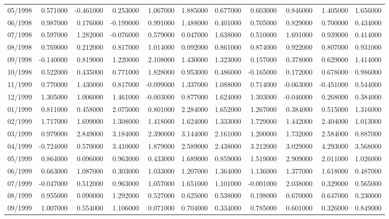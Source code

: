 \begin{tabular}{lrrrrrrrrrr}
05/1998 & 0.571000 & -0.461000 & 0.253000 & 1.067000 & 1.885000 & 0.677000 & 0.603000 & 0.846000 & 1.405000 & 1.656000 \\
06/1998 & 0.987000 & 0.176000 & -0.199000 & 0.991000 & 1.488000 & 0.401000 & 0.705000 & 0.829000 & 0.700000 & 0.434000 \\
07/1998 & 0.597000 & 1.282000 & -0.076000 & 0.579000 & 0.047000 & 1.638000 & 0.510000 & 1.691000 & 0.939000 & 0.414000 \\
08/1998 & 0.769000 & 0.212000 & 0.817000 & 1.014000 & 0.092000 & 0.861000 & 0.874000 & 0.922000 & 0.807000 & 0.931000 \\
09/1998 & -0.140000 & 0.819000 & 1.220000 & 2.108000 & 1.430000 & 1.323000 & 0.157000 & 0.378000 & 0.629000 & 1.414000 \\
10/1998 & 0.522000 & 0.435000 & 0.771000 & 1.828000 & 0.953000 & 0.486000 & -0.165000 & 0.172000 & 0.678000 & 0.986000 \\
11/1999 & 0.770000 & 1.430000 & 0.817000 & -0.099000 & 1.337000 & 1.088000 & 0.714000 & -0.063000 & -0.451000 & 0.544000 \\
12/1999 & 1.305000 & 1.006000 & 1.461000 & -0.003000 & 0.877000 & 1.624000 & 1.303000 & -0.046000 & 0.268000 & 0.384000 \\
01/1999 & 0.811000 & 0.458000 & 2.075000 & 0.801000 & 2.284000 & 1.652000 & 1.267000 & 0.384000 & 0.515000 & 1.316000 \\
02/1999 & 1.717000 & 1.699000 & 1.308000 & 1.418000 & 1.624000 & 1.333000 & 1.729000 & 1.442000 & 2.404000 & 1.013000 \\
03/1999 & 0.979000 & 2.849000 & 3.184000 & 2.390000 & 3.144000 & 2.161000 & 1.200000 & 1.732000 & 2.584000 & 0.887000 \\
04/1999 & -0.724000 & 0.570000 & 3.410000 & 1.879000 & 2.589000 & 2.438000 & 3.212000 & 3.029000 & 4.293000 & 3.568000 \\
05/1999 & 0.864000 & 0.096000 & 0.963000 & 0.433000 & 1.689000 & 0.859000 & 1.519000 & 2.909000 & 2.011000 & 1.026000 \\
06/1999 & 0.663000 & 1.087000 & 0.303000 & 1.033000 & 1.207000 & 1.364000 & 1.136000 & 1.377000 & 1.618000 & 0.487000 \\
07/1999 & -0.047000 & 0.512000 & 0.963000 & 1.057000 & 1.651000 & 1.101000 & -0.001000 & 2.038000 & 0.329000 & 0.565000 \\
08/1999 & 0.955000 & 0.090000 & 1.292000 & 0.527000 & 0.625000 & 0.538000 & 0.198000 & 0.670000 & 0.647000 & 0.230000 \\
09/1999 & 1.007000 & 0.554000 & 1.106000 & 0.071000 & 0.704000 & 0.334000 & 0.785000 & 0.601000 & 0.326000 & 0.849000 \\

\end{tabular}
